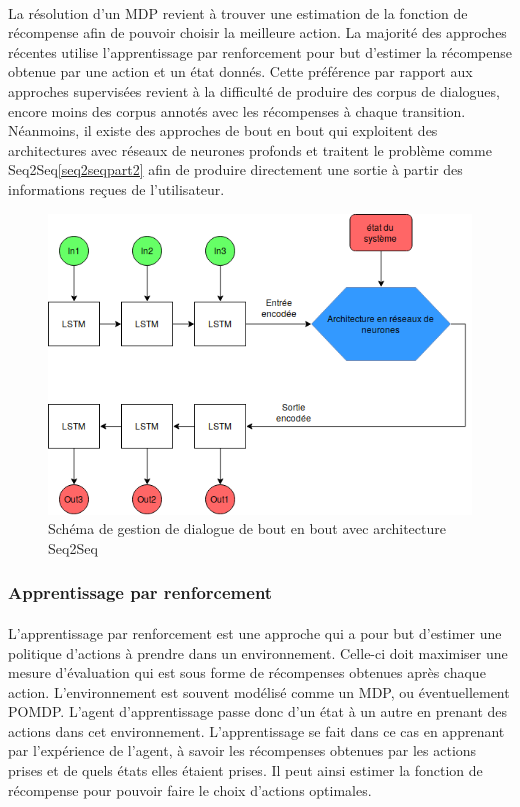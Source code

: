 		\paragraph{}
		La résolution d’un MDP revient à trouver une estimation de la fonction de récompense afin de pouvoir choisir la meilleure action. La majorité des approches récentes utilise l’apprentissage par renforcement pour but d’estimer la récompense obtenue par une action et un état donnés. Cette préférence par rapport aux approches supervisées revient à la difficulté de produire des corpus de dialogues\cite{Henderson2008}, encore moins des corpus annotés avec les récompenses à chaque transition. Néanmoins, il existe des approches de bout en bout qui exploitent des architectures avec réseaux de neurones profonds et traitent le problème comme Seq2Seq\ref{seq2seqpart2} afin de produire directement une sortie à partir des informations reçues de l’utilisateur\cite{Wen2017,Serban2016}.


\begin{figure}[H]
	\centering
	\includegraphics[width=.7\linewidth]{images/DM/DMSeq2Seq.png} 
	\caption{Schéma de gestion de dialogue de bout en bout avec architecture Seq2Seq} 
\end{figure}
\subsubsection{Apprentissage par renforcement} \label{reinf_learning}
\paragraph{}
L’apprentissage par renforcement est une approche qui a pour but d’estimer une politique d’actions à prendre dans un environnement. Celle-ci doit maximiser une mesure d’évaluation qui est sous forme de récompenses obtenues après chaque action\cite{Weisz2018}. L’environnement est souvent modélisé comme un MDP, ou éventuellement POMDP. L’agent d’apprentissage passe donc d’un état à un autre en prenant des actions dans cet environnement. L’apprentissage se fait dans ce cas en apprenant par l’expérience de l’agent, à savoir les récompenses obtenues par les actions prises et de quels états elles étaient prises. Il peut ainsi estimer la fonction de récompense pour pouvoir faire le choix d’actions optimales. 

